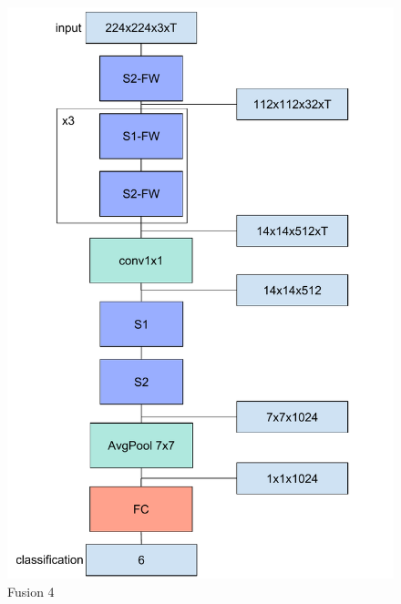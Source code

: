 \begin{figure}%
\includegraphics[width=\columnwidth]{figures/Reseau1Fusion4.pdf}%
\caption{Fusion 4}%
\label{fig:fusion4}%
\end{figure}


